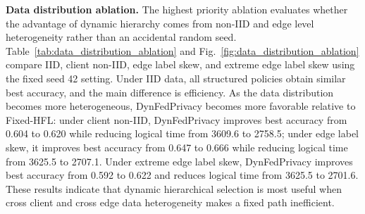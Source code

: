 ﻿\documentclass[preprint,12pt]{elsarticle}
\theoremstyle{plain}
\theoremstyle{definition}
\theoremstyle{remark}
\newcommand{\tabref}[1]{Table~\ref{#1}}
\newcommand{\figref}[1]{Fig.~\ref{#1}}
\newcommand{\method}{DynFedPrivacy}
\begin{document}
\textbf{Data distribution ablation.}
The highest priority ablation evaluates whether the advantage of dynamic hierarchy comes from non-IID and edge level heterogeneity rather than an accidental random seed.
\tabref{tab:data_distribution_ablation} and \figref{fig:data_distribution_ablation} compare IID, client non-IID, edge label skew, and extreme edge label skew using the fixed seed 42 setting.
Under IID data, all structured policies obtain similar best accuracy, and the main difference is efficiency.
As the data distribution becomes more heterogeneous, \method{} becomes more favorable relative to Fixed-HFL: under client non-IID, \method{} improves best accuracy from 0.604 to 0.620 while reducing logical time from 3609.6 to 2758.5; under edge label skew, it improves best accuracy from 0.647 to 0.666 while reducing logical time from 3625.5 to 2707.1.
Under extreme edge label skew, \method{} improves best accuracy from 0.592 to 0.622 and reduces logical time from 3625.5 to 2701.6.
These results indicate that dynamic hierarchical selection is most useful when cross client and cross edge data heterogeneity makes a fixed path inefficient.
\end{document}
